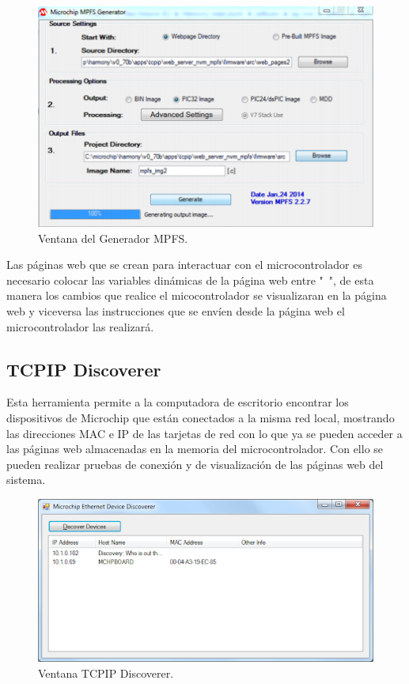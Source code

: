 \documentclass[letterpaper,12pt,oneside]{book}
\begin{document}
			\begin{figure}[!htpb]
				\centering
				\includegraphics[scale = 0.6]{Material de Consulta/GenMPFS.PNG}
				\caption[Generador MPFS]{Ventana del Generador MPFS.}
				\label{MPFS}
			\end{figure}

			Las páginas web que se crean para interactuar con el microcontrolador es necesario colocar las variables dinámicas de la página web entre "~", de esta manera los cambios que realice el micocontrolador se visualizaran en la página web y viceversa las instrucciones que se envíen desde la página web el microcontrolador las realizará.

			\subsection{TCPIP Discoverer}
			Esta herramienta permite a la computadora de escritorio encontrar los dispositivos de Microchip que están conectados a la misma red local, mostrando las direcciones MAC e IP de las tarjetas de red con lo que ya se pueden acceder a las páginas web almacenadas en la memoria del microcontrolador. Con ello se pueden realizar pruebas de conexión y de visualización de las páginas web del sistema.

			\begin{figure}[!htpb]
				\centering
				\includegraphics[scale = 0.5]{Material de Consulta/TCPIPdcvr.PNG}
				\caption[TCPIP Discoverer]{Ventana TCPIP Discoverer.}
				\label{TCPIP}
			\end{figure}
\end{document}
